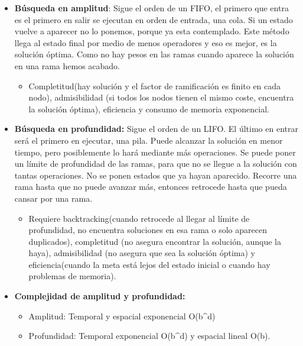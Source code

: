\documentclass[12pt, twoside, openright]{report} %
\begin{document}
  \begin{itemize}
  \item \textbf{Búsqueda en amplitud}: Sigue el orden de un FIFO, el primero
    que entra es el primero en salir se ejecutan en orden de entrada,
    una cola. Si un estado vuelve a aparecer no lo ponemos, porque ya
    esta contemplado. Este método llega al estado final por medio de
    menos operadores y eso es mejor, es la solución óptima. Como no hay
    pesos en las ramas cuando aparece la solución en una rama hemos
    acabado.
    

    \begin{itemize}
    \item Completitud(hay solución y el factor de ramificación es finito en
      cada nodo), admisibilidad (si todos los nodos tienen el mismo
      coste, encuentra la solución óptima), eficiencia y consumo de
      memoria exponencial.
      
    \end{itemize}
\pagebreak
  \item \textbf{Búsqueda en profundidad:} Sigue el orden de un LIFO. El
    último en entrar será el primero en ejecutar, una pila. Puede
    alcanzar la solución en menor tiempo, pero posiblemente lo hará
    mediante más operaciones. Se puede poner un límite de profundidad de
    las ramas, para que no se llegue a la solución con tantas
    operaciones. No se ponen estados que ya hayan aparecido. Recorre una
    rama hasta que no puede avanzar más, entonces retrocede hasta que
    pueda cansar por una rama.
    

    \begin{itemize}
    \item Requiere backtracking(cuando retrocede al llegar al límite de
      profundidad, no encuentra soluciones en esa rama o solo aparecen
      duplicados), completitud (no asegura encontrar la solución, aunque
      la haya), admisibilidad (no asegura que sea la solución óptima) y
      eficiencia(cuando la meta está lejos del estado inicial o cuando
      hay problemas de memoria).
      
    \end{itemize}
  \item \textbf{Complejidad de amplitud y profundidad:}
    

    \begin{itemize}
    \item Amplitud: Temporal y espacial exponencial O(b\^{}d)
      
    \item Profundidad: Temporal exponencial O(b\^{}d) y espacial lineal
      O(b).
      

\end{itemize}
\end{itemize}
\end{document}
